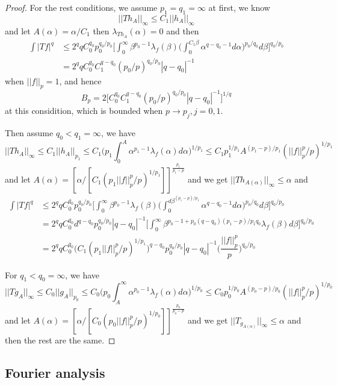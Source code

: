 \documentclass[lang=en, color=blue, ]{elegantbook}
\newcommand{\dstrb}[1]{\lambda_{#1}}
\begin{document}
\begin{proof}
    For the rest conditions, we assume $p_1 = q_1 = \infty$ at first, we know
    \[
    ||Th_A||_{\infty} \leq C_1||h_A||_{\infty}
    \]
    and let $A(\alpha) = \alpha/C_1$ then $\dstrb{Th_A}(\alpha) = 0$ and then
    \[
    \begin{aligned}
    \int|Tf|^q &\leq 2^qq C_0^{q_0}p_0^{q_0/p_0}\Big[\int_0^{\infty}\beta^{p_0-1}\dstrb{f}(\beta)\Big(\int_0^{C_1\beta} \alpha^{q-q_0-1}d\alpha\Big)^{p_0/q_0}d\beta\Big]^{q_0/p_0} \\
    &=2^qq C_0^{q_0}C_1^{q-q_0}(p_0/p)^{q_0/p_0}|q-q_0|^{-1}
    \end{aligned}
    \]
    when $||f||_p = 1$, and hence
    \[
    B_p = 2\Big[ C_0^{q_0}C_1^{q-q_0}(p_0/p)^{q_0/p_0}|q-q_0|^{-1}\Big]^{1/q}
    \]
    at this considition, which is bounded when $p\to p_j, j = 0,1$.\par
    Then assume $q_0 < q_1 = \infty$, we have
    \[||Th_A||_{\infty} \leq C_1||h_A||_{p_1} \leq C_1\Big(p_1\int_0^A \alpha^{p_1-1}\dstrb{f}(\alpha)d\alpha\Big)^{1/p_1} \leq C_1p_1^{1/p_1}A^{(p_1-p)/p_1}(||f||_p^p/p)^{1/p_1}\]
    and let $A(\alpha) = [\alpha/[C_1(p_1||f||_p^p/p)^{1/p_1}]]^{\tfrac{p_1}{p_1-p}}$ and we get $||Th_{A(\alpha)}||_{\infty} \leq \alpha$ and
    \[
    \begin{aligned}
    \int|Tf|^q &\leq 2^qq C_0^{q_0}p_0^{q_0/p_0}\Big[\int_0^{\infty}\beta^{p_0-1}\dstrb{f}(\beta)\Big(\int_0^{d\beta^{(p_1-p)/p_1}} \alpha^{q-q_0-1}d\alpha\Big)^{p_0/q_0}d\beta\Big]^{q_0/p_0} \\
    &=2^qq C_0^{q_0}d^{q-q_0}p_0^{q_0/p_0}|q-q_0|^{-1}\Big[\int_0^{\infty}\beta^{p_0-1+p_0(q-q_0)(p_1-p)/p_1q_0}\dstrb{f}(\beta)d\beta\Big]^{q_0/p_0} \\
    & = 2^qq C_0^{q_0}\Big(C_1(p_1||f||_p^p/p)^{1/p_1}\Big)^{q-q_0}p_0^{q_0/p_0}|q-q_0|^{-1}\Big(\dfrac{||f||_p^p}{p}\Big)^{q_0/p_0}
    \end{aligned}
    \]\par
    For $q_1 < q_0 = \infty$, we have
     \[||Tg_A||_{\infty} \leq C_0||g_A||_{p_0} \leq C_0\Big(p_0\int_A^{\infty} \alpha^{p_0-1}\dstrb{f}(\alpha)d\alpha\Big)^{1/p_0} \leq C_0p_0^{1/p_0}A^{(p_0-p)/p_0}(||f||_p^p/p)^{1/p_0}\]
    and let $A(\alpha) = [\alpha/[C_0(p_0||f||_p^p/p)^{1/p_0}]]^{\tfrac{p_0}{p_0-p}}$ and we get $||T_{g_{A(\alpha)}}||_{\infty} \leq \alpha$ and then the rest are the same.
\end{proof}

\newpage

\subsection*{Fourier analysis}
\end{document}
